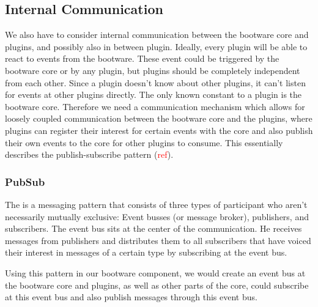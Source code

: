 \subsection{Internal Communication}

We also have to consider internal communication between the bootware core and plugins, and possibly also in between plugin.
Ideally, every plugin will be able to react to events from the bootware.
These event could be triggered by the bootware core or by any plugin, but plugins should be completely independent from each other.
Since a plugin doesn't know about other plugins, it can't listen for events at other plugins directly.
The only known constant to a plugin is the bootware core.
Therefore we need a communication mechanism which allows for loosely coupled communication between the bootware core and the plugins, where plugins can register their interest for certain events with the core and also publish their own events to the core for other plugins to consume.
This essentially describes the publish-subscribe pattern (\textcolor{red}{ref}).

\subsubsection{PubSub}

The  is a messaging pattern that consists of three types of participant who aren't necessarily mutually exclusive: Event busses (or message broker), publishers, and subscribers.
The event bus sits at the center of the communication.
He receives messages from publishers and distributes them to all subscribers that have voiced their interest in messages of a certain type by subscribing at the event bus.

Using this pattern in our bootware component, we would create an event bus at the bootware core and plugins, as well as other parts of the core, could subscribe at this event bus and also publish messages through this event bus.
